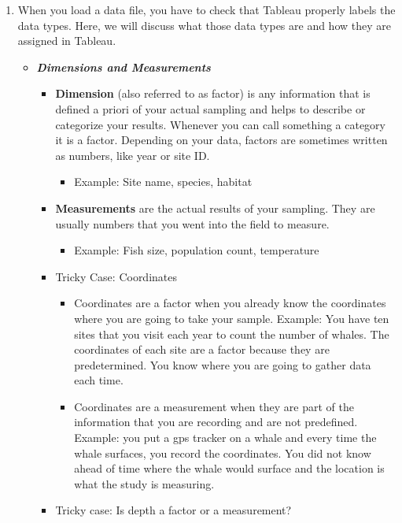 \documentclass[
]{book}
\providecommand{\tightlist}{%
  \setlength{\itemsep}{0pt}\setlength{\parskip}{0pt}}
\begin{document}
\begin{enumerate}
\def\labelenumi{\arabic{enumi}.}
\tightlist
\item
  When you load a data file, you have to check that Tableau properly labels the data types. Here, we will discuss what those data types are and how they are assigned in Tableau.

  \begin{itemize}
  \tightlist
  \item
    \textbf{\emph{Dimensions and Measurements}}

    \begin{itemize}
    \tightlist
    \item
      \textbf{Dimension} (also referred to as factor) is any information that is defined a priori of your actual sampling and helps to describe or categorize your results. Whenever you can call something a category it is a factor. Depending on your data, factors are sometimes written as numbers, like year or site ID.

      \begin{itemize}
      \tightlist
      \item
        Example: Site name, species, habitat
      \end{itemize}
    \item
      \textbf{Measurements} are the actual results of your sampling. They are usually numbers that you went into the field to measure.

      \begin{itemize}
      \tightlist
      \item
        Example: Fish size, population count, temperature
      \end{itemize}
    \item
      Tricky Case: Coordinates

      \begin{itemize}
      \tightlist
      \item
        Coordinates are a factor when you already know the coordinates where you are going to take your sample. Example: You have ten sites that you visit each year to count the number of whales. The coordinates of each site are a factor because they are predetermined. You know where you are going to gather data each time.
      \item
        Coordinates are a measurement when they are part of the information that you are recording and are not predefined. Example: you put a gps tracker on a whale and every time the whale surfaces, you record the coordinates. You did not know ahead of time where the whale would surface and the location is what the study is measuring.
      \end{itemize}
    \item
      Tricky case: Is depth a factor or a measurement?


\end{itemize}
\end{itemize}
\end{enumerate}
\end{document}

